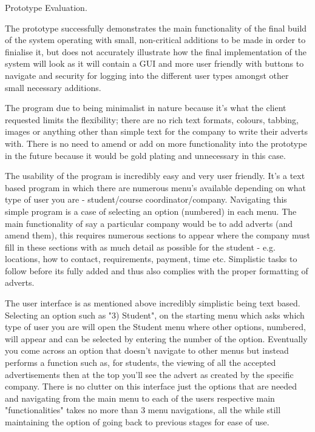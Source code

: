 Prototype Evaluation.

The prototype successfully demonstrates the main functionality of the final build of the system operating with small, non-critical additions to be made in order to finialise it, but does not accurately illustrate how the final implementation of the system will look as it will contain a GUI and more user friendly with buttons to navigate and security for logging into the different user types amongst other small necessary additions.

The program due to being minimalist in nature because it's what the client requested limits the flexibility; there are no rich text formats, colours, tabbing, images or anything other than simple text for the company to write their adverts with. There is no need to amend or add on more functionality into the prototype in the future because it would be gold plating and unnecessary in this case.

The usability of the program is incredibly easy and very user friendly. It's a text based program in which there are numerous menu's available depending on what type of user you are - student/course coordinator/company. Navigating this simple program is a case of selecting an option (numbered) in each menu. The main functionality of say a particular company would be to add adverts (and amend them), this requires numerous sections to appear where the company must fill in these sections with as much detail as possible for the student - e.g. locations, how to contact, requirements, payment, time etc. Simplistic tasks to follow before its fully added and thus also complies with the proper formatting of adverts.

The user interface is as mentioned above incredibly simplistic being text based. Selecting an option such as "3) Student", on the starting menu which asks which type of user you are will open the Student menu where other options, numbered, will appear and can be selected by entering the number of the option. Eventually you come across an option that doesn't navigate to other menus but instead performs a function such as, for students, the viewing of all the accepted advertisements then at the top you'll see the advert as created by the specific company. There is no clutter on this interface just the options that are needed and navigating from the main menu to each of the users respective main "functionalities" takes no more than 3 menu navigations, all the while still maintaining the option of going back to previous stages for ease of use.


